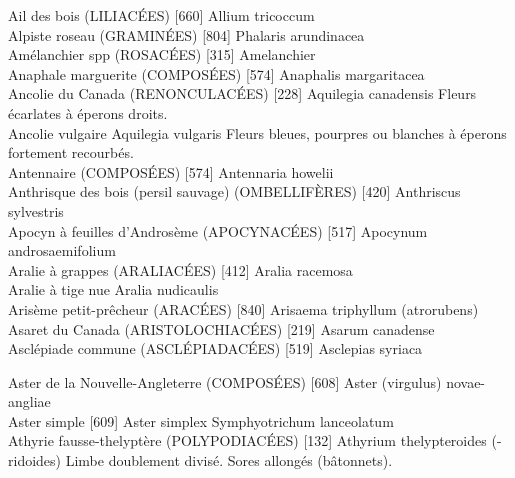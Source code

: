 Ail des bois (LILIACÉES)  [660]					
				Allium tricoccum\\

Alpiste roseau (GRAMINÉES)  [804]
				Phalaris arundinacea\\

Amélanchier spp (ROSACÉES)  [315]				
				Amelanchier\\

Anaphale marguerite (COMPOSÉES)  [574]
				Anaphalis margaritacea\\

Ancolie du Canada (RENONCULACÉES)  [228]
				Aquilegia canadensis
Fleurs écarlates à éperons droits.\\


Ancolie vulgaire
				Aquilegia vulgaris
Fleurs bleues, pourpres ou blanches à éperons fortement recourbés.\\


Antennaire (COMPOSÉES)  [574]
				Antennaria howelii\\
				


Anthrisque des bois (persil sauvage) (OMBELLIFÈRES)  [420]
				Anthriscus sylvestris\\
				

Apocyn à feuilles d’Androsème (APOCYNACÉES)  [517]
				Apocynum androsaemifolium\\


Aralie à grappes (ARALIACÉES)  [412]
				Aralia racemosa\\


Aralie à tige nue
				Aralia nudicaulis\\


Arisème petit-prêcheur (ARACÉES)  [840]					
				Arisaema triphyllum (atrorubens)\\


Asaret du Canada (ARISTOLOCHIACÉES)  [219]			
				Asarum canadense\\			


Asclépiade commune (ASCLÉPIADACÉES)  [519]
				Asclepias syriaca\\
\newpage

Aster de la Nouvelle-Angleterre (COMPOSÉES)  [608]
				Aster (virgulus)  novae-angliae\\

Aster simple  [609]
				Aster simplex
				Symphyotrichum lanceolatum\\

Athyrie fausse-thelyptère (POLYPODIACÉES)  [132]
				Athyrium thelypteroides (-ridoides)
Limbe doublement divisé. Sores allongés (bâtonnets).\\

